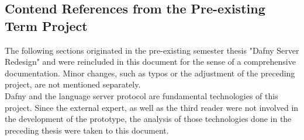 \subsection{Contend References from the Pre-existing Term Project}
The following sections originated in the pre-existing semester thesis "Dafny Server Redesign"\cite{sa} and were reincluded in this document for the sense of a comprehensive documentation.
Minor changes, such as typos or the adjustment of the preceding project, are not mentioned separately.\\

Dafny and the language server protocol are fundamental technologies of this project.
Since the external expert, as well as the third reader were not involved in the development of the prototype, the analysis of those technologies done in the preceding thesis were taken to this document.

